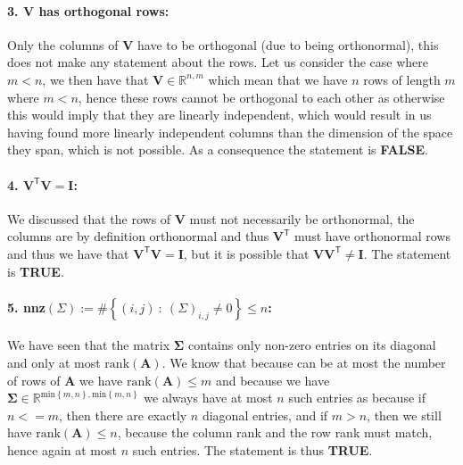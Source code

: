 \documentclass{article}
\begin{document}
\paragraph{3. $\mathbf{V}$ has orthogonal rows:} Only the columns of $\mathbf{V}$ have to be orthogonal (due to being orthonormal), this does not make any statement about the rows. Let us consider the case where $m < n$, we then have that $\mathbf{V}\in\mathbb{R}^{n,m}$ which mean that we have $n$ rows of length $m$ where $m < n$, hence these rows cannot be orthogonal to each other as otherwise this would imply that they are linearly independent, which would result in us having found more linearly independent columns than the dimension of the space they span, which is not possible. As a consequence the statement is \textbf{FALSE}.
\paragraph{4. $\mathbf{V}^{\mathsf{T}}\mathbf{V}=\mathbf{I}$:} 
We discussed that the rows of $\mathbf{V}$ must not necessarily be orthonormal, the columns are by definition orthonormal and thus $\mathbf{V}^{\mathsf{T}}$ must have orthonormal rows and thus we have that $\mathbf{V}^{\mathsf{T}}\mathbf{V} = \mathbf{I}$, but it is possible that $\mathbf{V}\mathbf{V}^{\mathsf{T}} \neq \mathbf{I}$. The statement is \textbf{TRUE}.

\paragraph{5. nnz$\left(\Sigma\right):=\#\left\{\left(i,j\right)\::\: \left(\Sigma\right)_{i,j}\neq 0\right\} \leq n$: } We have seen that the matrix $\mathbf{\Sigma}$ contains only non-zero entries on its diagonal and only at most $\text{rank}\left(\mathbf{A}\right)$. We know that because can be at most the number of rows of $\mathbf{A}$ we have $\text{rank}\left(\mathbf{A}\right) \leq m$ and because we have $\mathbf{\Sigma}\in \mathbb{R}^{\text{min}\left\{m,n\right\},\text{min}\left\{m,n\right\}}$ we always have at most $n$ such entries as because if $n <= m$, then there are exactly $n$ diagonal entries, and if $m > n$, then we still have $\text{rank}\left(\mathbf{A}\right) \leq n$, because the column rank and the row rank must match, hence again at most $n$ such entries. The statement is thus \textbf{TRUE}.
\end{document}
